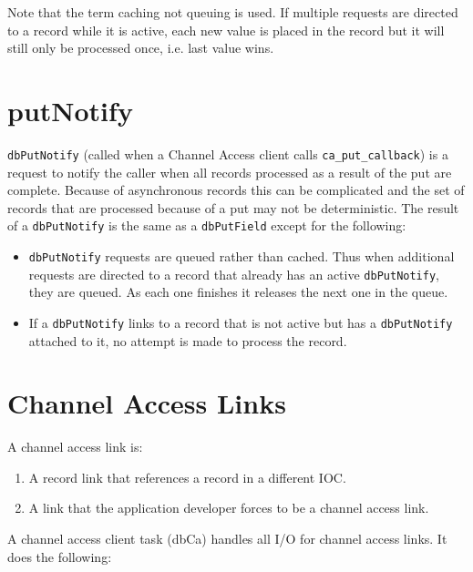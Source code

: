 Note that the term caching not queuing is used.
If multiple requests are directed to a record while it is active, each new value is placed in the record but it will still only be processed once, i.e. last value wins.

\section{putNotify}

\verb|dbPutNotify| (called when a Channel Access client calls \verb|ca_put_callback|) is a request to notify the caller when all 
records processed as a result of the put are complete.
Because of asynchronous records this can be complicated and the set of records that are processed because of a put may not be deterministic.
The result of a \verb|dbPutNotify| is the same as a \verb|dbPutField| except for the following:

\begin{itemize}
\item \verb|dbPutNotify| requests are queued rather than cached.
Thus when additional requests are directed to a record that already has an active \verb|dbPutNotify|, they are queued.
As each one finishes it releases the next one in the queue.

\item If a \verb|dbPutNotify| links to a record that is not active but has a \verb|dbPutNotify| attached to it, no attempt is made to process the record.

\end{itemize}

\section{Channel Access Links}

A channel access link is:

\begin{enumerate}
\item A record link that references a record in a different IOC.

\item A link that the application developer forces to be a channel access link.

\end{enumerate}

A channel access client task (dbCa)  handles all I/O for channel access links.
It does the following:

